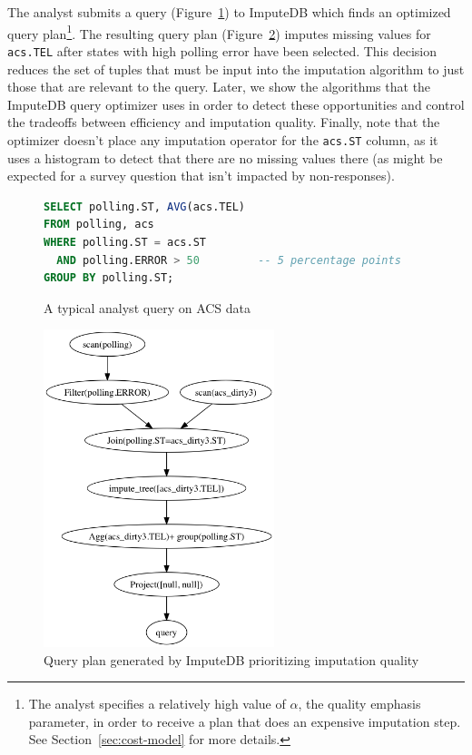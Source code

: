 The analyst submits a query (Figure~\ref{fig:example-query}) to ImputeDB which finds an optimized query
plan\footnote{The analyst specifies a relatively high value of $\alpha$, the quality
emphasis parameter, in order to receive a plan that does an expensive imputation step. See
Section~\ref{sec:cost-model} for more details.}. The resulting query plan
(Figure~\ref{fig:query-plan})
imputes missing values for \verb!acs.TEL! after states with high polling error have been
selected. This decision reduces the set of tuples that must be input into the imputation
algorithm to just those that are relevant to the query. Later, we show the algorithms that
the ImputeDB query optimizer uses in order to detect these opportunities and control the
tradeoffs between efficiency and imputation quality. Finally, note that the optimizer doesn't
place any imputation operator for the \verb|acs.ST| column, as it uses a histogram to
detect that there are no missing values there (as might be expected for a survey question that isn't
impacted by non-responses).

\begin{figure}
\begin{lstlisting}[language=SQL]
SELECT polling.ST, AVG(acs.TEL)
FROM polling, acs
WHERE polling.ST = acs.ST
  AND polling.ERROR > 50         -- 5 percentage points
GROUP BY polling.ST;
\end{lstlisting}
\caption{A typical analyst query on ACS data}
\label{fig:example-query}
\end{figure}

\begin{figure}[!ht]
    \centering
    \includegraphics[width=0.6\textwidth]{figures/example.png}
    \caption{Query plan generated by ImputeDB prioritizing imputation quality}
    \label{fig:query-plan}
\end{figure}
        

